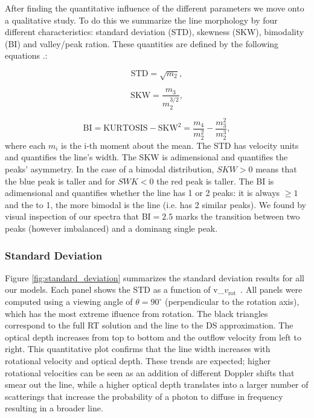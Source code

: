 \documentclass[a4paper,fleqn,usenatbib]{mnras}
\newcommand{\vrot}{\ifmmode v_{\mathrm{rot}}\else $v_{\mathrm{rot}}$~\fi}
\begin{document}
After finding the quantitative influence of the different parameters we
move onto a qualitative study.
To do this we summarize the line morphology by four different
characteristics: standard deviation (STD), skewness (SKW), bimodality
(BI) and valley/peak ration.
These quantities are defined by the following equations \citep{kokoska1999}.:

\begin{equation}
\label{eq:std}
\mathrm{STD} = \sqrt{m_2},
\end{equation}

\begin{equation}
\label{eq:skw}
\mathrm{SKW} = \frac{m_3}{m_2^{3/2}},
\end{equation}

\begin{equation}
\label{eq:bi}
\mathrm{BI} = \mathrm{KURTOSIS} - \mathrm{SKW}^2 = \frac{m_4}{m_2^{2}} - \frac{m_3^2}{m_2^{3}},
\end{equation}
%
where each $m_i$ is the i-th moment about the mean. 
The STD has velocity units and quantifies the line's width.
The SKW is adimensional and quantifies the peaks' asymmetry. 
In the case of a bimodal distribution, $SKW>0$ means that the blue
peak is taller and for $SWK<0$ the red peak is taller. 
The BI is adimensional and quantifies whether the line has 1 or 2
peaks: it is  always $\geq 1$ \citep{Pearson1929} and the 
to 1, the more bimodal is the line (i.e. has 2 similar peaks). 
We found by visual inspection of our spectra that BI$=2.5$ marks the
transition between two peaks (however imbalanced) and a dominang
single peak.


\subsubsection{Standard Deviation}
Figure \ref{fig:standard_deviation} summarizes the standard deviation
results for all our models.
Each panel shows the STD as a function of \vrot.
All panels were computed using a viewing angle of $\theta =
90^{\circ}$ (perpendicular to the rotation axis), which has the most
extreme ifluence from rotation.
 The black triangles
correspond to the full RT solution and the line to the DS
approximation.  
The optical depth increases from top to bottom and the outflow
velocity from left to right.
This quantitative plot confirms that the line width increases with
rotational velocity and optical depth.
These trends are expected; higher rotational velocities can be seen as
an addition of different Doppler shifts that smear out the line, while
a higher optical depth translates into a larger number of scatterings
that increase the probability of a photon to diffuse in frequency
resulting in a broader line.
\end{document}
